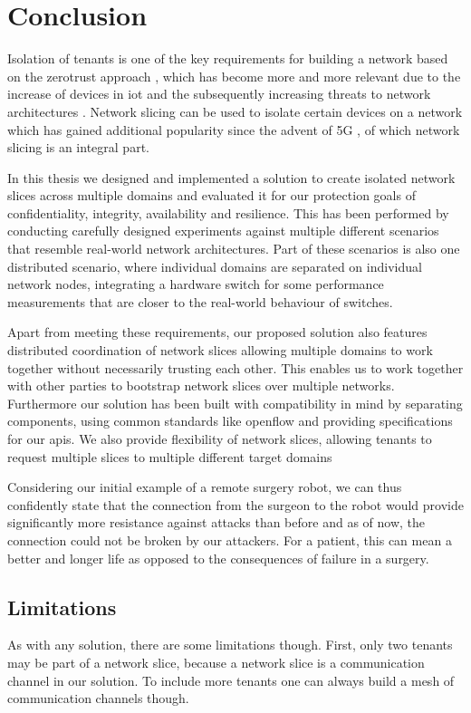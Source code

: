 \chapter{Conclusion}
\label{conclusion}

Isolation of tenants is one of the key requirements for building a network based on the \gls{zerotrust} approach \cite{zerotrust}, which has become more and more relevant due to the increase of devices in \acrshort{iot} \cite{iotincrease} and the subsequently increasing threats to network architectures \cite{iotthreats}. Network slicing can be used to isolate certain devices on a network which has gained additional popularity since the advent of 5G \cite{5G1, 5G2, 5G3}, of which network slicing is an integral part.

In this thesis we designed and implemented a solution to create isolated network slices across multiple domains and evaluated it for our protection goals of confidentiality, integrity, availability and resilience. This has been performed by conducting carefully designed experiments against multiple different scenarios that resemble real-world network architectures. Part of these scenarios is also one distributed scenario, where individual domains are separated on individual network nodes, integrating a hardware switch for some performance measurements that are closer to the real-world behaviour of switches.

Apart from meeting these requirements, our proposed solution also features distributed coordination of network slices allowing multiple domains to work together without necessarily trusting each other. This enables us to work together with other parties to bootstrap network slices over multiple networks. Furthermore our solution has been built with compatibility in mind by separating components, using common standards like \Gls{openflow} and providing specifications for our \acrshort{api}s. We also provide flexibility of network slices, allowing tenants to request multiple slices to multiple different target domains

Considering our initial example of a remote surgery robot, we can thus confidently state that the connection from the surgeon to the robot would provide significantly more resistance against attacks than before and as of now, the connection could not be broken by our attackers. For a patient, this can mean a better and longer life as opposed to the consequences of failure in a surgery.


\section{Limitations}
As with any solution, there are some limitations though. First, only two tenants may be part of a network slice, because a network slice is a communication channel in our solution. To include more tenants one can always build a mesh of communication channels though.

